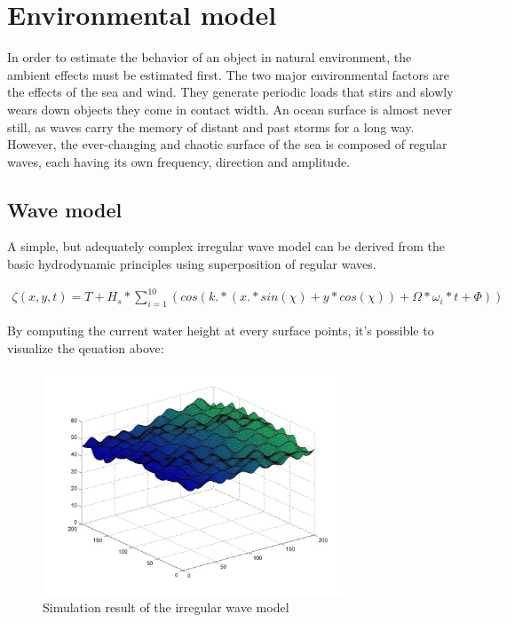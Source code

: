 \section{Environmental model}

In order to estimate the behavior of an object in natural environment, the ambient effects must be estimated first. The two major environmental factors are the effects of the sea and wind. They generate periodic loads that stirs and slowly wears down objects they come in contact width. An ocean surface is almost never still, as waves carry the memory of distant and past storms for a long way. However, the ever-changing and chaotic surface of the sea is composed of regular waves, each having its own frequency, direction and amplitude.

\subsection{Wave model} A simple, but adequately complex irregular wave model\cite[p.~14]{shipsim} can be derived from the basic hydrodynamic principles using superposition of regular waves\cite[p.~19]{hydromechanics}.

\begin{align}
		\zeta (x, y, t) = T + H_s * \sum_{i=1}^{10} (cos(k .* (x .* sin(\chi) + y * cos(\chi)) + \Omega * \omega{_i} * t + \Phi))
\end{align}

By computing the current water height at every surface points, it's possible to visualize the qeuation above:

\begin{figure}[H]
	\centering
	\includegraphics[width=0.8\textwidth]{fig/wavemodel}
	\caption{Simulation result of the irregular wave model}
	\label{fig:wavemodel}
\end{figure}

